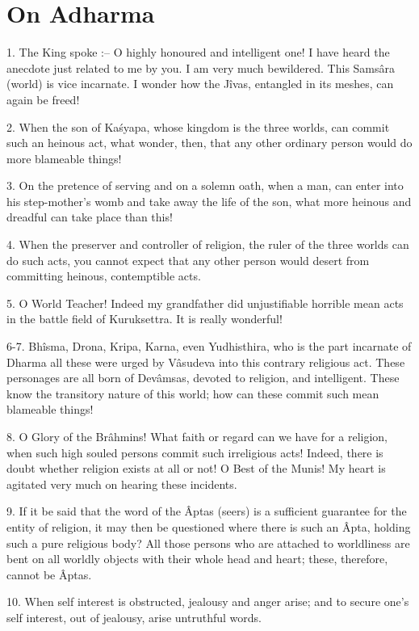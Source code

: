﻿\chapter{On Adharma}

1. The King spoke :-- O highly honoured and intelligent one! I have heard the anecdote just related to me by you. I am very much bewildered. This Sams\^ara (world) is vice incarnate. I wonder how the J\^ivas, entangled in its meshes, can again be freed!

2. When the son of Ka\'syapa, whose kingdom is the three worlds, can commit such an heinous act, what wonder, then, that any other ordinary person would do more blameable things!

3. On the pretence of serving and on a solemn oath, when a man, can enter into his step-mother's womb and take away the life of the son, what more heinous and dreadful can take place than this!

4. When the preserver and controller of religion, the ruler of the three worlds can do such acts, you cannot expect that any other person would desert from committing heinous, contemptible acts.

5. O World Teacher! Indeed my grandfather did unjustifiable horrible mean acts in the battle field of Kuruksettra.    It is really wonderful!

6-7. Bh\^isma, Drona, Kripa, Karna, even Yudhisthira, who is the part incarnate of Dharma all these were urged by V\^asudeva into this contrary religious act. These personages are all born of Dev\^amsas, devoted to religion, and intelligent. These know the transitory nature of this world; how can these commit such mean blameable things!

8. O Glory of the Br\^ahmins! What faith or regard can we have for a religion, when such high souled persons commit such irreligious acts! Indeed, there is doubt whether religion exists at all or not! O Best of the Munis! My heart is agitated very much on hearing these incidents.

9. If it be said that the word of the \^Aptas (seers) is a sufficient guarantee for the entity of religion, it may then be questioned where there is such an \^Apta, holding such a pure religious body? All those persons who are attached to worldliness are bent on all worldly objects with their whole head and heart; these, therefore, cannot be \^Aptas.

10. When self interest is obstructed, jealousy and anger arise; and to secure one's self interest, out of jealousy, arise untruthful words.

